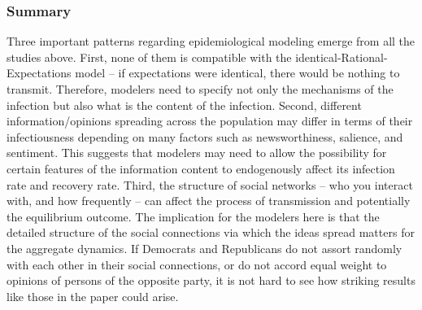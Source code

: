  \subsubsection{Summary}
 Three important patterns regarding epidemiological modeling emerge from all the studies above.  First, none of them is compatible with the identical-Rational-Expectations model -- if expectations were identical, there would be nothing to transmit. Therefore, modelers need to specify not only the mechanisms of the infection but also what is the content of the infection.   Second, different information/opinions spreading across the population may differ in terms of their infectiousness depending on many factors such as newsworthiness, salience, and sentiment. This suggests that modelers may need to allow the possibility for certain features of the information content to endogenously affect its infection rate and recovery rate.  Third, the structure of social networks -- who you interact with, and how frequently -- can affect the process of transmission and potentially the equilibrium outcome.  The implication for the modelers here is that the detailed structure of the social connections via which the ideas spread matters for the aggregate dynamics.
 If Democrats and Republicans do not assort randomly with each other in their social connections, or do not accord equal weight to opinions of persons of the opposite party, it is not hard to see how striking results like those in the \cite{meeuwis2018belief} paper could arise.